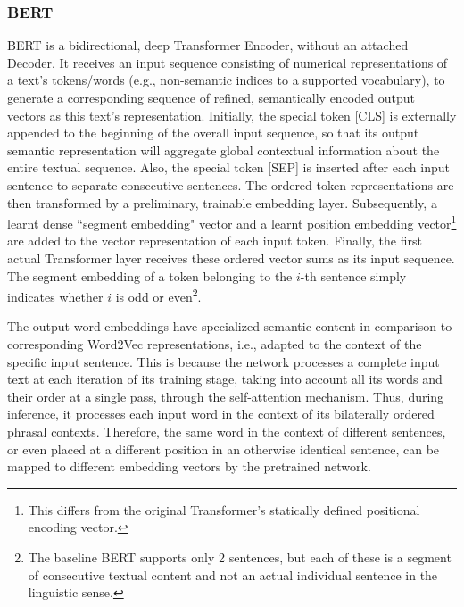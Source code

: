 \documentclass[preprint,review,10pt]{elsarticle}
\begin{document}
	\subsubsection{BERT}
	BERT is a bidirectional, deep Transformer Encoder, without an attached Decoder. It receives an input sequence consisting of numerical representations of a text's tokens/words (e.g., non-semantic indices to a supported vocabulary), to generate a corresponding sequence of refined, semantically encoded output vectors as this text's representation. Initially, the special token [CLS] is externally appended to the beginning of the overall input sequence, so that its output semantic representation will aggregate global contextual information about the entire textual sequence. Also, the special token [SEP] is inserted after each input sentence to separate consecutive sentences. The ordered token representations are then transformed by a preliminary, trainable embedding layer. Subsequently, a learnt dense ``segment embedding" vector and a learnt position embedding vector\footnote{This differs from the original Transformer's statically defined positional encoding vector.} are added to the vector representation of each input token. Finally, the first actual Transformer layer receives these ordered vector sums as its input sequence. The segment embedding of a token belonging to the $i$-th sentence simply indicates whether $i$ is odd or even\footnote{The baseline BERT supports only 2 sentences, but each of these is a segment of consecutive textual content and not an actual individual sentence in the linguistic sense.}.
	
	The output word embeddings have specialized semantic content in comparison to corresponding Word2Vec representations, i.e., adapted to the context of the specific input sentence. This is because the network processes a complete input text at each iteration of its training stage, taking into account all its words and their order at a single pass, through the self-attention mechanism. Thus, during inference, it processes each input word in the context of its bilaterally ordered phrasal contexts. Therefore, the same word in the context of different sentences, or even placed at a different position in an otherwise identical sentence, can be mapped to different embedding vectors by the pretrained network.
	
\end{document}
